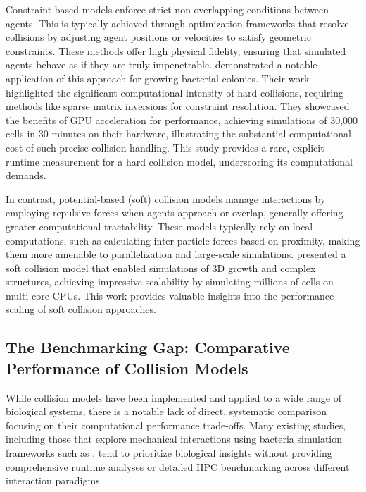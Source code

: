 \documentclass[conference]{IEEEtran}
\begin{document}
\begin{description}[style=nextline]
    \item[Constraint-Based (Hard) Collision Models]
        Constraint-based models enforce strict non-overlapping conditions between agents. This is typically achieved through optimization frameworks that resolve collisions by adjusting agent positions or velocities to satisfy geometric constraints. These methods offer high physical fidelity, ensuring that simulated agents behave as if they are truly impenetrable. \cite{Rudge2012} demonstrated a notable application of this approach for growing bacterial colonies. Their work highlighted the significant computational intensity of hard collisions, requiring methods like sparse matrix inversions for constraint resolution. They showcased the benefits of GPU acceleration for performance, achieving simulations of 30,000 cells in 30 minutes on their hardware, illustrating the substantial computational cost of such precise collision handling. This study provides a rare, explicit runtime measurement for a hard collision model, underscoring its computational demands.

    \item[Potential-Based (Soft) Collision Models]
        In contrast, potential-based (soft) collision models manage interactions by employing repulsive forces when agents approach or overlap, generally offering greater computational tractability. These models typically rely on local computations, such as calculating inter-particle forces based on proximity, making them more amenable to parallelization and large-scale simulations. \cite{Warren2019} presented a soft collision model that enabled simulations of 3D growth and complex structures, achieving impressive scalability by simulating millions of cells on multi-core CPUs. This work provides valuable insights into the performance scaling of soft collision approaches.
\end{description}

\subsection{The Benchmarking Gap: Comparative Performance of Collision Models}

While collision models have been implemented and applied to a wide range of biological systems, there is a notable lack of direct, systematic comparison focusing on their computational performance trade-offs. Many existing studies, including those that explore mechanical interactions using bacteria simulation frameworks such as \cite{Rudge2012}\cite{Weady2024}\cite{Blanchard2015}\cite{Ghosh2015}\cite{You2018}\cite{Warren2019}\cite{Khan_2024}, tend to prioritize biological insights without providing comprehensive runtime analyses or detailed HPC benchmarking across different interaction paradigms.
\end{document}
